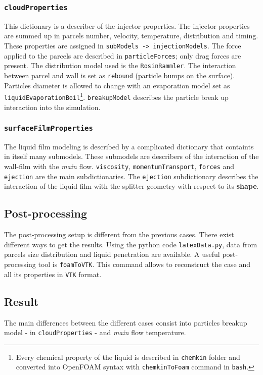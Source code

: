     \cprotect\subsubsection{\verb|cloudProperties|}
    This dictionary is a describer of the injector properties. The injector properties are summed up in parcels number, velocity, temperature, distribution and timing. These properties are assigned in \verb|subModels -> injectionModels|. The force applied to the parcels are described in \verb|particleForces|; only drag forces are present. The distribution model used is the \verb|RosinRammler|. The interaction between parcel and wall is set as \verb|rebound| (particle bumps on the surface). Particles diameter is allowed to change with an evaporation model set as \verb|liquidEvaporationBoil|\cprotect\footnote{Every chemical property of the liquid is described in \verb|chemkin| folder and converted into OpenFOAM syntax with \verb|chemkinToFoam| command in \verb|bash|.}. \verb|breakupModel| describes the particle break up interaction into the simulation.   

    \cprotect\subsubsection{\verb|surfaceFilmProperties|}
    The liquid film modeling is described by a complicated dictionary that containts in itself many submodels. These submodels are describers of the interaction of the wall-film with the \textit{main} flow. \verb|viscosity|, \verb|momentumTransport|, \verb|forces| and \verb|ejection| are the main subdictionaries. The \verb|ejection| subdictionary describes the interaction of the liquid film with the splitter geometry with respect to its \textbf{shape}. 
    
    \subsection{Post-processing}
    The post-processing setup is different from the previous cases. There exist different ways to get the results. Using the python code \verb|latexData.py|, data from parcels size distribution and liquid penetration are available. A useful post-processing tool is \verb|foamToVTK|. This command allows to reconstruct the case and all its properties in \verb|VTK| format.

    \subsection{Result}
    The main differences between the different cases consist into particles breakup model - in \verb|cloudProperties| - and \textit{main} flow temperature. 
    
